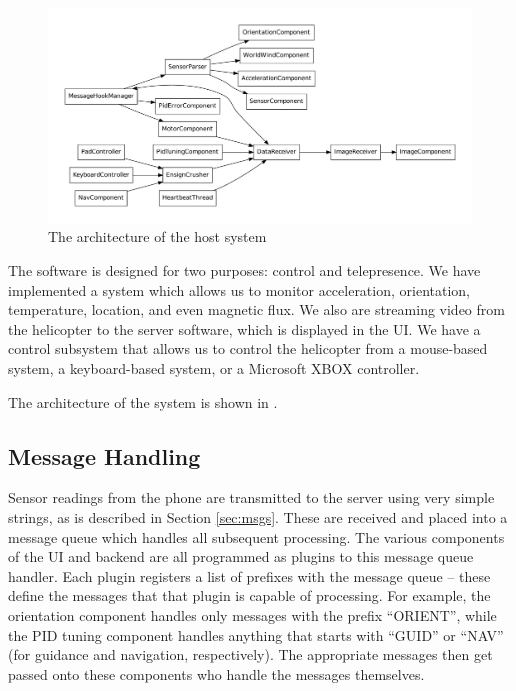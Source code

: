 \begin{landscape}
  \begin{figure}[h]
    \centering
    \includegraphics[scale=.5]{figures/hostarch}
    \caption{The architecture of the host system}
    \label{fig:hostarch}
  \end{figure}
\end{landscape}

The software is designed for two purposes: control and
telepresence. We have implemented a system which allows us to monitor
acceleration, orientation, temperature, location, and even magnetic
flux. We also are streaming video from the helicopter to the server
software, which is displayed in the UI. We have a control subsystem
that allows us to control the helicopter from a mouse-based system, a
keyboard-based system, or a Microsoft XBOX controller. 

The architecture of the system is shown in .

\subsection{Message Handling}
Sensor readings from the phone are transmitted to the server using
very simple strings, as is described in Section \ref{sec:msgs}. These
are received and placed into a message queue which handles all
subsequent processing. The various components of the UI and backend
are all programmed as plugins to this message queue handler. Each
plugin registers a list of prefixes with the message queue -- these
define the messages that that plugin is capable of processing. For
example, the orientation component handles only messages with the
prefix ``ORIENT'', while the PID tuning component handles anything
that starts with ``GUID'' or ``NAV'' (for guidance and navigation,
respectively). The appropriate messages then get passed onto these
components who handle the messages themselves.

